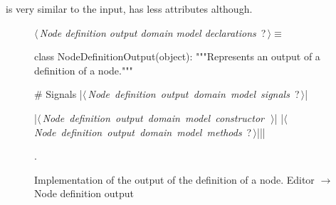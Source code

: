 \documentclass[%
    a4paper,    %
    justified,  %
    nobib,      %
    openany     %
]{tufte-book}
\makeatletter
\renewcommand{\label}[1]{\@tufte@label{##1}}%
\makeatother
\begin{document}
 is very similar to
the input, has less attributes although.

\begin{figure}
\begin{flushleft} \small
\begin{minipage}{\linewidth}\label{scrap138}\raggedright\small
{} $\langle\,${\itshape Node definition output domain model declarations}\nobreak\ {\footnotesize {?}}$\,\rangle\equiv$
\vspace{-1ex}
\begin{pythoncode}
class NodeDefinitionOutput(object):
    """Represents an output of a definition of a node."""

    # Signals
    |\hbox{$\langle\,${\itshape Node definition output domain model signals}\nobreak\ {\footnotesize ?}$\,\rangle$}|

    |\hbox{$\langle\,${\itshape Node definition output domain model constructor}\nobreak\ {\footnotesize {}}$\,\rangle$}|
    |\hbox{$\langle\,${\itshape Node definition output domain model methods}\nobreak\ {\footnotesize ?}$\,\rangle$}||\NWsep|
\end{pythoncode}
\vspace{1.5ex}
\footnotesize
\begin{list}{}{\setlength{\itemsep}{-\parsep}\setlength{\itemindent}{-\leftmargin}}
\item {\NWtxtMacroNoRef}.

\item{}
\end{list}
\end{minipage}\vspace{4ex}
\end{flushleft}
\caption{Implementation of the output of the definition of a node.
  \newline{}\newline{}Editor $\rightarrow$ Node definition output}
\label{editor:lst:node-definition-output}
\end{figure}
\end{document}
